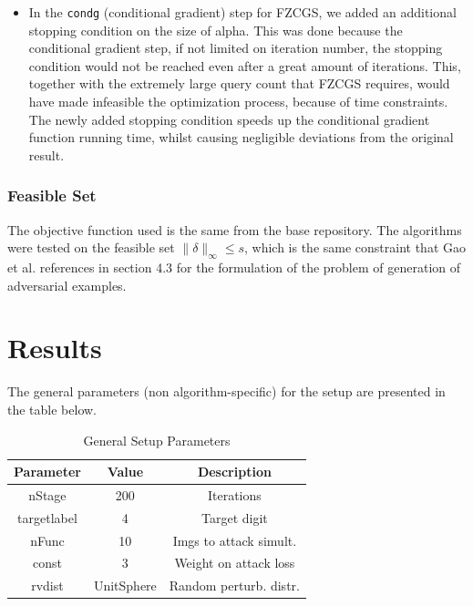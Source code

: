 \documentclass[10pt,twocolumn,letterpaper]{article}
\begin{document}
\begin{itemize}
   \item In the \texttt{condg} (conditional gradient) step for FZCGS,
   we added an additional stopping condition on the size of alpha.
   This was done because the conditional gradient step, if not limited
   on iteration number, the stopping condition would not be reached even
   after a great amount of iterations. This, together with the extremely large query count
   that FZCGS requires, would have made infeasible the optimization process,
   because of time constraints. The newly added stopping condition speeds up
   the conditional gradient function running time, whilst causing negligible
   deviations from the original result.
\end{itemize}

\subsubsection{Feasible Set}

The objective function used is the same from the base repository.
The algorithms were tested on the feasible set $\|\delta\|_{\infty} \leq s$,
which is the same constraint that Gao et al. references in section 4.3 for the formulation
of the problem of generation of adversarial examples.


\section{Results}

The general parameters (non algorithm-specific) for the setup are presented in the table below.

\begin{table}[h]
   \centering
   \begin{tabular}{ccc}
       \hline
       \textbf{Parameter} & \textbf{Value} & \textbf{Description} \\
       \hline
       nStage & 200 & Iterations\\
       \hline
       targetlabel & 4 & Target digit\\
       \hline
       nFunc & 10 & Imgs to attack simult.\\
       \hline
       const & 3 & Weight on attack loss\\
       \hline
       rvdist & UnitSphere & Random perturb. distr.\\ 
       \hline
   \end{tabular}\\
   \
   \caption{General Setup Parameters} 
   \label{tab:general_params}
\end{table}
\end{document}
